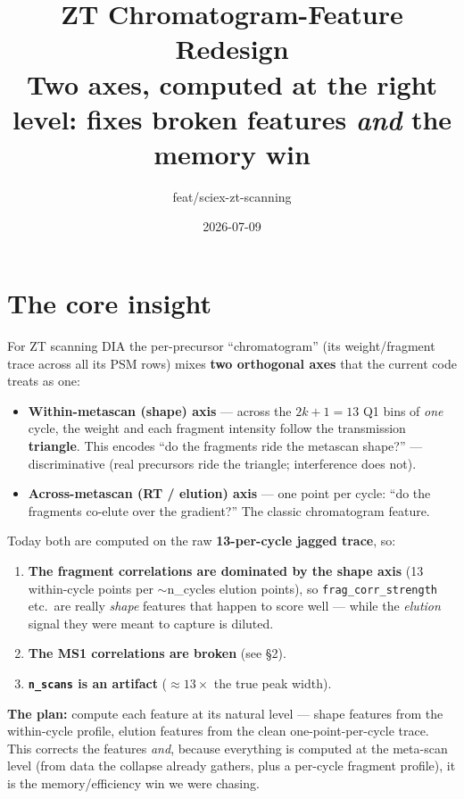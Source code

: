 \documentclass[11pt]{article}
\title{\textbf{ZT Chromatogram-Feature Redesign}\\[4pt]
\large Two axes, computed at the right level: fixes broken features \emph{and} the memory win}
\author{feat/sciex-zt-scanning}
\date{2026-07-09}
\newcommand{\code}[1]{\texttt{\small #1}}
\begin{document}
\maketitle

\section{The core insight}

For ZT scanning DIA the per-precursor ``chromatogram'' (its weight/fragment trace
across all its PSM rows) mixes \textbf{two orthogonal axes} that the current code
treats as one:

\begin{itemize}
\item \textbf{Within-metascan (shape) axis} --- across the $2k{+}1{=}13$ Q1 bins of
\emph{one} cycle, the weight and each fragment intensity follow the transmission
\textbf{triangle}. This encodes ``do the fragments ride the metascan shape?'' ---
discriminative (real precursors ride the triangle; interference does not).
\item \textbf{Across-metascan (RT / elution) axis} --- one point per cycle: ``do the
fragments co-elute over the gradient?'' The classic chromatogram feature.
\end{itemize}

Today both are computed on the raw \textbf{13-per-cycle jagged trace}, so:
\begin{enumerate}
\item \textbf{The fragment correlations are dominated by the shape axis} (13
within-cycle points per $\sim$n\_cycles elution points), so \code{frag\_corr\_strength}
etc.\ are really \emph{shape} features that happen to score well --- while the
\emph{elution} signal they were meant to capture is diluted.
\item \textbf{The MS1 correlations are broken} (see §2).
\item \textbf{\code{n\_scans} is an artifact} ($\approx 13\times$ the true peak width).
\end{enumerate}

\textbf{The plan:} compute each feature at its natural level --- shape features from
the within-cycle profile, elution features from the clean one-point-per-cycle trace.
This corrects the features \emph{and}, because everything is computed at the
meta-scan level (from data the collapse already gathers, plus a per-cycle fragment
profile), it is the memory/efficiency win we were chasing.
\end{document}
